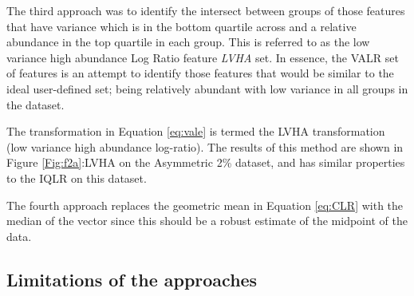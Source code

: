 \documentclass{bmcart}
\begin{document}



The third approach was to identify the intersect between groups of those features that have variance which is in the bottom quartile across and a relative abundance in the top quartile in each group. This is referred to as the low variance high abundance Log Ratio feature \textit{LVHA} set. In essence, the VALR set of features is an attempt to identify those features that would be similar to the ideal user-defined set; being relatively abundant with low variance in all groups in the dataset.  
 
The transformation in Equation \ref{eq:vale} is termed the LVHA transformation (low variance high abundance log-ratio). The results of this method are shown in Figure \ref{Fig:f2a}:LVHA on the Asymmetric 2\% dataset, and has similar properties to the IQLR on this dataset. 

The fourth approach replaces the geometric mean in Equation \ref{eq:CLR} with the  median of the vector since this should be a robust estimate of the midpoint of the data. 

\subsection*{Limitations of the approaches}
\end{document}
